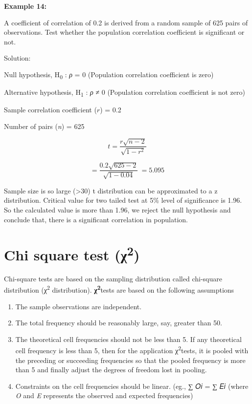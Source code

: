\documentclass[
]{book}
\begin{document}
\textbf{Example 14:}

A coefficient of correlation of 0.2 is derived from a random sample of 625 pairs of observations. Test whether the population correlation coefficient is significant or not.

Solution:

Null hypothesis, H\textsubscript{0} : \emph{ρ} = 0 (Population correlation coefficient is zero)

Alternative hypothesis, H\textsubscript{1} : \emph{ρ} ≠ 0 (Population correlation coefficient is not zero)

Sample correlation coefficient (\(r\)) = 0.2

Number of pairs (\emph{n}) = 625

\[t = \frac{r\sqrt{n - 2}}{\sqrt{1 - r^{2}}}\]

\[= \frac{0.2\sqrt{625 - 2}}{\sqrt{1 - 0.04}}\  = 5.095\]

Sample size is so large (\textgreater30) t distribution can be approximated to a z distribution. Critical value for two tailed test at 5\% level of significance is 1.96. So the calculated value is more than 1.96, we reject the null hypothesis and conclude that, there is a significant correlation in population.

\hypertarget{chi-square-test-ux3c72}{%
\section{\texorpdfstring{Chi square test (χ\textsuperscript{2})}{Chi square test (χ2)}}\label{chi-square-test-ux3c72}}

Chi-square tests are based on the sampling distribution called chi-square distribution (χ\textsuperscript{2} distribution). \textbf{χ\textsuperscript{2}}tests are based on the following assumptions

\begin{enumerate}
\def\labelenumi{\arabic{enumi}.}
\item
  The sample observations are independent.
\item
  The total frequency should be reasonably large, say, greater than 50.
\item
  The theoretical cell frequencies should not be less than 5. If any theoretical cell frequency is less than 5, then for the application χ\textsuperscript{2}tests, it is pooled with the preceding or succeeding frequencies so that the pooled frequency is more than 5 and finally adjust the degrees of freedom lost in pooling.
\item
  Constraints on the cell frequencies should be linear. (eg., ∑ 𝑂𝑖 = ∑ 𝐸𝑖 (where \emph{O} and \emph{E} represents the observed and expected frequencies)
\end{enumerate}
\end{document}
